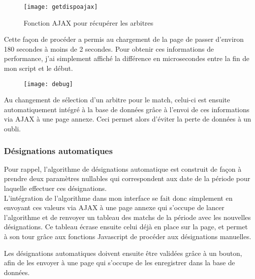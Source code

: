 \begin{figure}[!h]
    \centering
    \texttt{[image: getdispoajax]}
    \caption{Fonction AJAX pour récupérer les arbitres}
\end{figure}

Cette façon de procéder a permis au chargement de la page de passer d’environ 180 secondes à moins de 2 secondes. Pour obtenir ces informations de performance, j’ai simplement affiché la différence en microsecondes entre la fin de mon script et le début.

\begin{figure}[!h]
    \centering
    \texttt{[image: debug]}
\end{figure}

Au changement de sélection d’un arbitre pour le match, celui-ci est ensuite automatiquement intégré à la base de données grâce à l’envoi de ces informations via AJAX à une page annexe. Ceci permet alors d’éviter la perte de données  à un oubli.

\newpage 

\subsubsection{Désignations automatiques}
\vspace{1cm}

Pour rappel, l’algorithme de désignations automatique est construit de façon à prendre deux paramètres nullables qui correspondent aux date de la période pour laquelle effectuer ces désignations.\\ 

L’intégration de l’algorithme dans mon interface se fait donc simplement en envoyant ces valeurs via AJAX à une page annexe qui s’occupe de lancer l’algorithme et de renvoyer un tableau des matchs de la période avec les nouvelles désignations.
Ce tableau écrase ensuite celui déjà en place sur la page, et permet à son tour grâce aux fonctions Javascript de procéder aux désignations manuelles.

Les désignations automatiques doivent ensuite être validées grâce à un bouton, afin de les envoyer à une page qui s’occupe de les enregistrer dans la base de données.